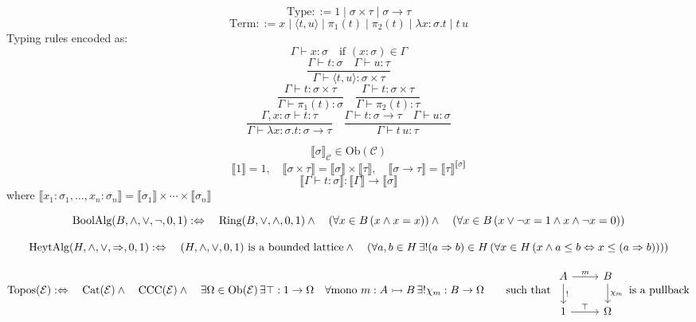 \documentclass{article}
\begin{document}
\[
\text{Type} ::= 1 \mid \sigma \times \tau \mid \sigma \to \tau
\]
\[
\text{Term} ::= x \mid \langle t, u \rangle \mid \pi_1(t) \mid \pi_2(t) \mid \lambda x : \sigma . t \mid t \, u
\]
Typing rules encoded as:
\[
\Gamma \vdash x : \sigma \quad \text{if } (x : \sigma) \in \Gamma
\]
\[
\frac{\Gamma \vdash t : \sigma \quad \Gamma \vdash u : \tau}{\Gamma \vdash \langle t, u \rangle : \sigma \times \tau}
\]
\[
\frac{\Gamma \vdash t : \sigma \times \tau}{\Gamma \vdash \pi_1(t) : \sigma}
\quad
\frac{\Gamma \vdash t : \sigma \times \tau}{\Gamma \vdash \pi_2(t) : \tau}
\]
\[
\frac{\Gamma, x : \sigma \vdash t : \tau}{\Gamma \vdash \lambda x : \sigma . t : \sigma \to \tau}
\quad
\frac{\Gamma \vdash t : \sigma \to \tau \quad \Gamma \vdash u : \sigma}{\Gamma \vdash t \, u : \tau}
\]

\[
\llbracket \sigma \rrbracket_{\mathcal{C}} \in \text{Ob}(\mathcal{C})
\]
\[
\llbracket 1 \rrbracket = 1, \quad
\llbracket \sigma \times \tau \rrbracket = \llbracket \sigma \rrbracket \times \llbracket \tau \rrbracket, \quad
\llbracket \sigma \to \tau \rrbracket = \llbracket \tau \rrbracket^{\llbracket \sigma \rrbracket}
\]
\[
\llbracket \Gamma \vdash t : \sigma \rrbracket : \llbracket \Gamma \rrbracket \to \llbracket \sigma \rrbracket
\]
where $\llbracket x_1 : \sigma_1, \dots, x_n : \sigma_n \rrbracket = \llbracket \sigma_1 \rrbracket \times \cdots \times \llbracket \sigma_n \rrbracket$

\[
\text{BoolAlg}(B, \land, \lor, \neg, 0, 1) :\Leftrightarrow \\
\quad \text{Ring}(B, \lor, \land, 0, 1) \land \\
\quad (\forall x \in B \, (x \land x = x)) \land \\
\quad (\forall x \in B \, (x \lor \neg x = 1 \land x \land \neg x = 0))
\]

\[
\text{HeytAlg}(H, \land, \lor, \Rightarrow, 0, 1) :\Leftrightarrow \\
\quad (H, \land, \lor, 0, 1) \text{ is a bounded lattice} \land \\
\quad (\forall a, b \in H \, \exists! (a \Rightarrow b) \in H \, (\forall x \in H \, (x \land a \leq b \Leftrightarrow x \leq (a \Rightarrow b))))
\]

\[
\text{Topos}(\mathcal{E}) :\Leftrightarrow \\
\quad \text{Cat}(\mathcal{E}) \land \\
\quad \text{CCC}(\mathcal{E}) \land \\
\quad \exists \Omega \in \text{Ob}(\mathcal{E}) \, \exists \top : 1 \to \Omega \, \\
\quad \forall \text{mono } m : A \rightarrowtail B \, \exists! \chi_m : B \to \Omega \, \\
\quad\quad \text{such that } \begin{tikzcd}
A \arrow[r, "m"] \arrow[d, "!"] & B \arrow[d, "\chi_m"] \\
1 \arrow[r, "\top"] & \Omega
\end{tikzcd} \text{ is a pullback}
\]
\end{document}
